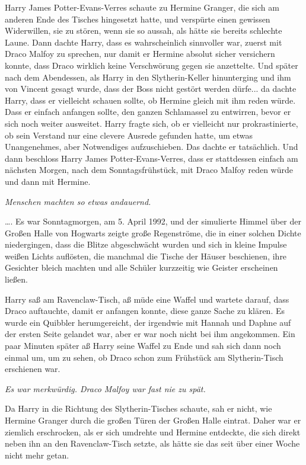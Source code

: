Harry James Potter-Evans-Verres schaute zu Hermine Granger, die sich am anderen
Ende des Tisches hingesetzt hatte, und verspürte einen gewissen Widerwillen, sie
zu stören, wenn sie so aussah, als hätte sie bereits schlechte Laune. Dann
dachte Harry, dass es wahrscheinlich sinnvoller war, zuerst mit Draco Malfoy zu
sprechen, nur damit er Hermine absolut sicher versichern konnte, dass Draco
wirklich keine Verschwörung gegen sie anzettelte. Und später nach dem
Abendessen, als Harry in den Slytherin-Keller hinunterging und ihm von Vincent
gesagt wurde, dass der Boss nicht gestört werden dürfe... da dachte Harry, dass
er vielleicht schauen sollte, ob Hermine gleich mit ihm reden würde. Dass er
einfach anfangen sollte, den ganzen Schlamassel zu entwirren, bevor er sich noch
weiter ausweitet. Harry fragte sich, ob er vielleicht nur prokrastinierte, ob
sein Verstand nur eine clevere Ausrede gefunden hatte, um etwas Unangenehmes,
aber Notwendiges aufzuschieben. Das dachte er tatsächlich. Und dann beschloss
Harry James Potter-Evans-Verres, dass er stattdessen einfach am nächsten Morgen,
nach dem Sonntagsfrühstück, mit Draco Malfoy reden würde und dann mit Hermine.

\emph{Menschen machten so etwas andauernd.}

…. Es war Sonntagmorgen, am 5. April 1992, und der simulierte Himmel über der
Großen Halle von Hogwarts zeigte große Regenströme, die in einer solchen Dichte
niedergingen, dass die Blitze abgeschwächt wurden und sich in kleine Impulse
weißen Lichts auflösten, die manchmal die Tische der Häuser beschienen, ihre
Gesichter bleich machten und alle Schüler kurzzeitig wie Geister erscheinen
ließen.

Harry saß am Ravenclaw-Tisch, aß müde eine Waffel und wartete darauf, dass Draco
auftauchte, damit er anfangen konnte, diese ganze Sache zu klären. Es wurde ein
Quibbler herumgereicht, der irgendwie mit Hannah und Daphne auf der ersten
Seite gelandet war, aber er war noch nicht bei ihm angekommen. Ein paar Minuten
später aß Harry seine Waffel zu Ende und sah sich dann noch einmal um, um zu
sehen, ob Draco schon zum Frühstück am Slytherin-Tisch erschienen war.

\emph{Es war merkwürdig. Draco Malfoy war fast nie zu spät.}

Da Harry in die Richtung des Slytherin-Tisches schaute, sah er nicht, wie
Hermine Granger durch die großen Türen der Großen Halle eintrat. Daher war er
ziemlich erschrocken, als er sich umdrehte und Hermine entdeckte, die sich
direkt neben ihn an den Ravenclaw-Tisch setzte, als hätte sie das seit über
einer Woche nicht mehr getan.

